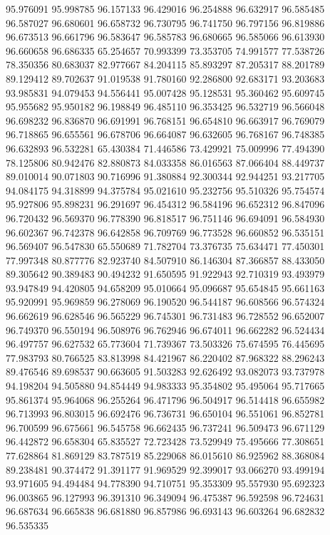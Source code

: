 95.976091
95.998785
96.157133
96.429016
96.254888
96.632917
96.585485
96.587027
96.680601
96.658732
96.730795
96.741750
96.797156
96.819886
96.673513
96.661796
96.583647
96.585783
96.680665
96.585066
96.613930
96.660658
96.686335
65.254657
70.993399
73.353705
74.991577
77.538726
78.350356
80.683037
82.977667
84.204115
85.893297
87.205317
88.201789
89.129412
89.702637
91.019538
91.780160
92.286800
92.683171
93.203683
93.985831
94.079453
94.556441
95.007428
95.128531
95.360462
95.609745
95.955682
95.950182
96.198849
96.485110
96.353425
96.532719
96.566048
96.698232
96.836870
96.691991
96.768151
96.654810
96.663917
96.769079
96.718865
96.655561
96.678706
96.664087
96.632605
96.768167
96.748385
96.632893
96.532281
65.430384
71.446586
73.429921
75.009996
77.494390
78.125806
80.942476
82.880873
84.033358
86.016563
87.066404
88.449737
89.010014
90.071803
90.716996
91.380884
92.300344
92.944251
93.217705
94.084175
94.318899
94.375784
95.021610
95.232756
95.510326
95.754574
95.927806
95.898231
96.291697
96.454312
96.584196
96.652312
96.847096
96.720432
96.569370
96.778390
96.818517
96.751146
96.694091
96.584930
96.602367
96.742378
96.642858
96.709769
96.773528
96.660852
96.535151
96.569407
96.547830
65.550689
71.782704
73.376735
75.634471
77.450301
77.997348
80.877776
82.923740
84.507910
86.146304
87.366857
88.433050
89.305642
90.389483
90.494232
91.650595
91.922943
92.710319
93.493979
93.947849
94.420805
94.658209
95.010664
95.096687
95.654845
95.661163
95.920991
95.969859
96.278069
96.190520
96.544187
96.608566
96.574324
96.662619
96.628546
96.565229
96.745301
96.731483
96.728552
96.652007
96.749370
96.550194
96.508976
96.762946
96.674011
96.662282
96.524434
96.497757
96.627532
65.773604
71.739367
73.503326
75.674595
76.445695
77.983793
80.766525
83.813998
84.421967
86.220402
87.968322
88.296243
89.476546
89.698537
90.663605
91.503283
92.626492
93.082073
93.737978
94.198204
94.505880
94.854449
94.983333
95.354802
95.495064
95.717665
95.861374
95.964068
96.255264
96.471796
96.504917
96.514418
96.655982
96.713993
96.803015
96.692476
96.736731
96.650104
96.551061
96.852781
96.700599
96.675661
96.545758
96.662435
96.737241
96.509473
96.671129
96.442872
96.658304
65.835527
72.723428
73.529949
75.495666
77.308651
77.628864
81.869129
83.787519
85.229068
86.015610
86.925962
88.368084
89.238481
90.374472
91.391177
91.969529
92.399017
93.066270
93.499194
93.971605
94.494484
94.778390
94.710751
95.353309
95.557930
95.692323
96.003865
96.127993
96.391310
96.349094
96.475387
96.592598
96.724631
96.687634
96.665838
96.681880
96.857986
96.693143
96.603264
96.682832
96.535335
